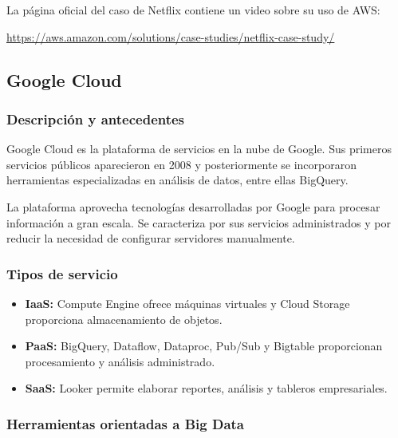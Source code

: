 La página oficial del caso de Netflix contiene un video sobre su uso de AWS:

\url{https://aws.amazon.com/solutions/case-studies/netflix-case-study/}


\subsection{Google Cloud}

\subsubsection*{Descripción y antecedentes}

Google Cloud es la plataforma de servicios en la nube de Google. Sus primeros
servicios públicos aparecieron en 2008 y posteriormente se incorporaron
herramientas especializadas en análisis de datos, entre ellas BigQuery.

La plataforma aprovecha tecnologías desarrolladas por Google para procesar
información a gran escala. Se caracteriza por sus servicios administrados y
por reducir la necesidad de configurar servidores manualmente.

\subsubsection*{Tipos de servicio}

\begin{itemize}
    \item \textbf{IaaS:} Compute Engine ofrece máquinas virtuales y Cloud
    Storage proporciona almacenamiento de objetos.
    
    \item \textbf{PaaS:} BigQuery, Dataflow, Dataproc, Pub/Sub y Bigtable
    proporcionan procesamiento y análisis administrado.
    
    \item \textbf{SaaS:} Looker permite elaborar reportes, análisis y tableros
    empresariales.
\end{itemize}

\subsubsection*{Herramientas orientadas a Big Data}

